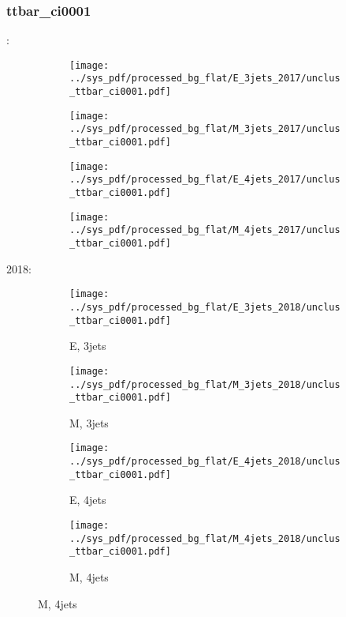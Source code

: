 \documentclass{beamer}
\begin{document}
\begin{frame}
\frametitle{ttbar_ci0001}
\fontsize{5}{1}:
\begin{figure}
\centering
\begin{subfigure}[b]{0.24\textwidth}
\texttt{[image: ../sys\_pdf/processed\_bg\_flat/E\_3jets\_2017/unclus\_ttbar\_ci0001.pdf]}
\end{subfigure}
\begin{subfigure}[b]{0.24\textwidth}
\texttt{[image: ../sys\_pdf/processed\_bg\_flat/M\_3jets\_2017/unclus\_ttbar\_ci0001.pdf]}
\end{subfigure}
\begin{subfigure}[b]{0.24\textwidth}
\texttt{[image: ../sys\_pdf/processed\_bg\_flat/E\_4jets\_2017/unclus\_ttbar\_ci0001.pdf]}
\end{subfigure}
\begin{subfigure}[b]{0.24\textwidth}
\texttt{[image: ../sys\_pdf/processed\_bg\_flat/M\_4jets\_2017/unclus\_ttbar\_ci0001.pdf]}
\end{subfigure}
\end{figure}
2018:
\begin{figure}
\centering
\begin{subfigure}[b]{0.24\textwidth}
\texttt{[image: ../sys\_pdf/processed\_bg\_flat/E\_3jets\_2018/unclus\_ttbar\_ci0001.pdf]}
\captionsetup{font=tiny}
\caption{E, 3jets}
\end{subfigure}
\begin{subfigure}[b]{0.24\textwidth}
\texttt{[image: ../sys\_pdf/processed\_bg\_flat/M\_3jets\_2018/unclus\_ttbar\_ci0001.pdf]}
\captionsetup{font=tiny}
\caption{M, 3jets}
\end{subfigure}
\begin{subfigure}[b]{0.24\textwidth}
\texttt{[image: ../sys\_pdf/processed\_bg\_flat/E\_4jets\_2018/unclus\_ttbar\_ci0001.pdf]}
\captionsetup{font=tiny}
\caption{E, 4jets}
\end{subfigure}
\begin{subfigure}[b]{0.24\textwidth}
\texttt{[image: ../sys\_pdf/processed\_bg\_flat/M\_4jets\_2018/unclus\_ttbar\_ci0001.pdf]}
\captionsetup{font=tiny}
\caption{M, 4jets}
\end{subfigure}
\end{figure}
\end{frame}
\end{document}
